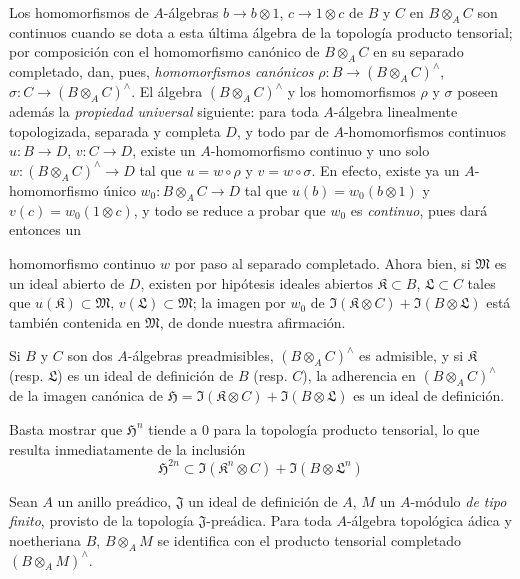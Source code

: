 \begin{env}[7.7.6]
\label{0.7.7.6-fr}
Los homomorfismos de $A$-álgebras $b\to b\otimes 1$,
$c\to 1\otimes c$ de $B$ y $C$ en $B\otimes_A C$ son continuos
cuando se dota a esta última álgebra de la topología producto tensorial;
por composición con el homomorfismo canónico de $B\otimes_A C$ en su
separado completado, dan, pues, \emph{homomorfismos canónicos}
$\rho:B\to(B\otimes_A C)^\wedge$, $\sigma:C\to(B\otimes_A C)^\wedge$.
El álgebra $(B\otimes_A C)^\wedge$ y los homomorfismos $\rho$ y $\sigma$
poseen además la \emph{propiedad universal} siguiente: para toda
$A$-álgebra linealmente topologizada, separada y completa $D$, y todo
par de $A$-homomorfismos continuos $u:B\to D$, $v:C\to D$, existe un
$A$-homomorfismo continuo y uno solo
$w:(B\otimes_A C)^\wedge\to D$ tal que $u=w\circ\rho$ y
$v=w\circ\sigma$. En efecto, existe ya un $A$-homomorfismo único
$w_0:B\otimes_A C\to D$ tal que $u(b)=w_0(b\otimes 1)$ y
$v(c)=w_0(1\otimes c)$, y todo se reduce a probar que $w_0$ es \emph{continuo},
pues dará entonces un


homomorfismo continuo $w$ por paso al separado completado. Ahora bien, si
$\mathfrak M$ es un ideal abierto de $D$, existen por hipótesis ideales
abiertos $\mathfrak K\subset B$, $\mathfrak L\subset C$ tales que
$u(\mathfrak K)\subset\mathfrak M$, $v(\mathfrak L)\subset\mathfrak M$;
la imagen por $w_0$ de
$\Im(\mathfrak K\otimes C)+\Im(B\otimes\mathfrak L)$ está también
contenida en $\mathfrak M$, de donde nuestra afirmación.
\end{env}

\begin{proposition}[7.7.7]
\label{0.7.7.7-fr}
Si $B$ y $C$ son dos $A$-álgebras preadmisibles,
$(B\otimes_A C)^\wedge$ es admisible, y si $\mathfrak K$ \textup{(resp.
$\mathfrak L$)} es un ideal de definición de $B$ \textup{(resp. $C$)}, la adherencia
en $(B\otimes_A C)^\wedge$ de la imagen canónica de
$\mathfrak H=\Im(\mathfrak K\otimes C)+\Im(B\otimes\mathfrak L)$ es
un ideal de definición.
\end{proposition}

Basta mostrar que $\mathfrak H^n$ tiende a $0$ para la topología
producto tensorial, lo que resulta inmediatamente de la inclusión
\[
  \mathfrak H^{2n}\subset
  \Im(\mathfrak K^n\otimes C)+\Im(B\otimes\mathfrak L^n)
\]

\begin{proposition}[7.7.8]
\label{0.7.7.8-fr}
Sean $A$ un anillo preádico, $\mathfrak J$ un ideal de definición de
$A$, $M$ un $A$-módulo \emph{de tipo finito}, provisto de la topología
$\mathfrak J$-preádica. Para toda $A$-álgebra topológica ádica y
noetheriana $B$, $B\otimes_A M$ se identifica con el producto tensorial completado
$(B\otimes_A M)^\wedge$.
\end{proposition}

